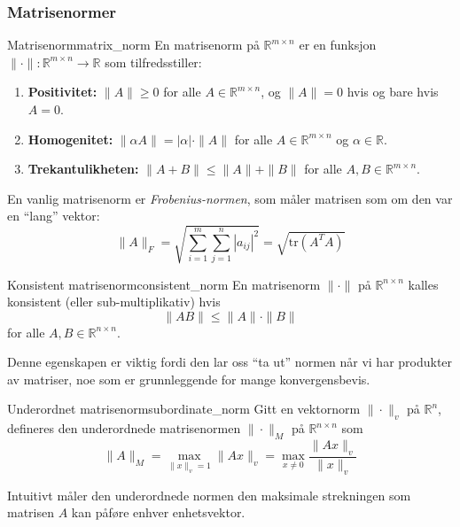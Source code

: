 \documentclass[../../main.tex]{subfiles}
\begin{document}
\subsubsection{Matrisenormer}

\begin{definition}{Matrisenorm}{matrix_norm}
    En matrisenorm på $\mathbb{R}^{m \times n}$ er en funksjon $\|\cdot\| : \mathbb{R}^{m \times n} \to \mathbb{R}$ som tilfredsstiller:
    \begin{enumerate}
        \item \textbf{Positivitet:} $\|A\| \geq 0$ for alle $A \in \mathbb{R}^{m \times n}$, og $\|A\| = 0$ hvis og bare hvis $A = 0$.
        \item \textbf{Homogenitet:}
              $\|\alpha A\| = |\alpha| \cdot \|A\|$ for alle $A \in \mathbb{R}^{m \times n}$ og $\alpha \in \mathbb{R}$.
        \item \textbf{Trekantulikheten:}
              $\|A + B\| \leq \|A\| + \|B\|$ for alle $A,B \in \mathbb{R}^{m \times n}$.
    \end{enumerate}
\end{definition}

En vanlig matrisenorm er \emph{Frobenius-normen}, som måler matrisen som om den var en \enquote{lang} vektor:
\[
    \|A\|_F = \sqrt{\sum_{i=1}^m \sum_{j=1}^n |a_{ij}|^2} = \sqrt{\text{tr}(A^T A)}
\]

\begin{definition}{Konsistent matrisenorm}{consistent_norm}
    En matrisenorm $\|\cdot\|$ på $\mathbb{R}^{n \times n}$ kalles konsistent (eller sub-multiplikativ) hvis
    \[
        \|AB\| \leq \|A\| \cdot \|B\|
    \]
    for alle $A, B \in \mathbb{R}^{n \times n}$.
\end{definition}

Denne egenskapen er viktig fordi den lar oss \enquote{ta ut} normen når vi har produkter av matriser, noe som er grunnleggende for mange konvergensbevis.

\begin{definition}{Underordnet matrisenorm}{subordinate_norm}
    Gitt en vektornorm $\|\cdot\|_v$ på $\mathbb{R}^n$, defineres den underordnede matrisenormen $\|\cdot\|_M$ på $\mathbb{R}^{n \times n}$ som
    \[
        \|A\|_M = \max_{\|x\|_v = 1} \|Ax\|_v = \max_{x \neq 0} \frac{\|Ax\|_v}{\|x\|_v}
    \]
\end{definition}

Intuitivt måler den underordnede normen den maksimale strekningen som matrisen $A$ kan påføre enhver enhetsvektor.
\end{document}
